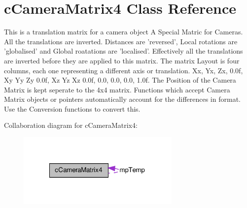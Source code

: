 \hypertarget{classc_camera_matrix4}{
\section{cCameraMatrix4 Class Reference}
\label{classc_camera_matrix4}
}


This is a translation matrix for a camera object A Special Matric for Cameras. All the translations are inverted. Distances are 'reversed', Local rotations are 'globalised' and Global roatations are 'localised'. Effectively all the translations are inverted before they are applied to this matrix. The matrix Layout is four columns, each one representing a different axis or translation. Xx, Yx, Zx, 0.0f, Xy Yy Zy 0.0f, Xz Yz Xz 0.0f, 0.0, 0.0, 0.0, 1.0f. The Position of the Camera Matrix is kept seperate to the 4x4 matrix. Functions which accept Camera Matrix objects or pointers automatically account for the differences in format. Use the Conversion functions to convert this.  




Collaboration diagram for cCameraMatrix4:\nopagebreak
\begin{figure}[H]
\begin{center}
\leavevmode
\includegraphics[width=225pt]{classc_camera_matrix4__coll__graph}
\end{center}
\end{figure}
